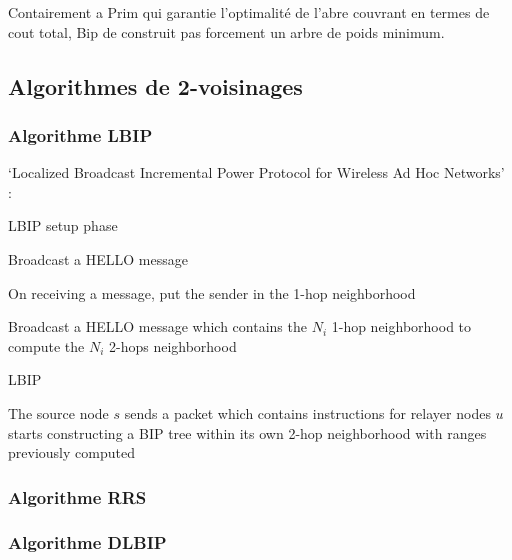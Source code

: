 Contairement a Prim qui garantie l'optimalité de l'abre couvrant en termes de cout total,
Bip de construit pas forcement un arbre de poids minimum.


\subsection{Algorithmes de 2-voisinages}
\subsubsection{Algorithme LBIP}
`Localized Broadcast Incremental Power Protocol for Wireless Ad Hoc Networks' :\cite{Ingelrest04}

\begin{algorithm}[h]
\caption{LBIP setup phase}
\label{algo_LBIP_sp}
\begin{algorithmic}

	\STATE Broadcast a HELLO message
\ENDFOR

\STATE On receiving a message, put the sender in the 1-hop neighborhood

	\STATE Broadcast a HELLO message which contains the $N_i$ 1-hop neighborhood to compute the $N_i$ 2-hops neighborhood
\ENDFOR


\end{algorithmic}
\end{algorithm}



\begin{algorithm}[h]
\caption{LBIP}
\label{algo_LBIP}
\begin{algorithmic}

\STATE The source node $s$ sends a packet which contains instructions for relayer nodes
		\STATE $u$ starts constructing a BIP tree within its own 2-hop neighborhood with ranges previously computed
	\ENDIF
\ENDIF

\end{algorithmic}
\end{algorithm}

\subsubsection{Algorithme RRS}
\cite{RNG03}
\subsubsection{Algorithme DLBIP}
\cite{Baert07}
